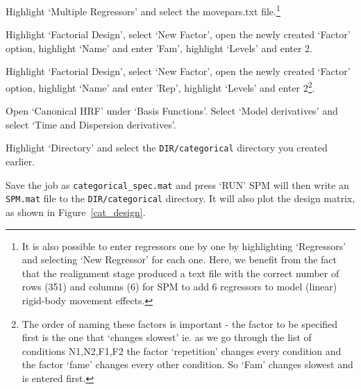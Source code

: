 \item{Highlight `Multiple Regressors' and select the {\sf movepars.txt} file.\footnote{It is also possible to enter regressors one by one by highlighting `Regressors' and selecting `New Regressor' for each one. Here, we benefit from the fact that the realignment stage produced a text file with the correct number of rows (351) and columns (6) for SPM to add 6 regressors to model (linear) rigid-body movement effects.}}
\item{Highlight `Factorial Design', select `New Factor', open the newly created `Factor' option, highlight `Name' and enter 'Fam', highlight `Levels' and enter 2.}
\item{Highlight `Factorial Design', select `New Factor', open the newly created `Factor' option, highlight `Name' and enter 'Rep', highlight `Levels' and enter 2\footnote{The order of naming these factors is important - the factor to be specified first is the one that `changes slowest' ie. as we go through the list of conditions N1,N2,F1,F2 the factor `repetition' changes every condition and the 
factor `fame' changes every other condition. So `Fam' changes slowest and is entered first.}.}
\item{Open `Canonical HRF' under `Basis Functions'. Select `Model derivatives' and select `Time and Dispersion derivatives'.}
\item{Highlight `Directory' and select the \verb!DIR/categorical! directory you created earlier.}
\item{Save the job as \verb!categorical_spec.mat! and press `RUN'}
\ei
SPM will then write an \verb$SPM.mat$ file to the 
\verb!DIR/categorical! directory. It will also plot the design
matrix, as shown in Figure~\ref{cat_design}. 
